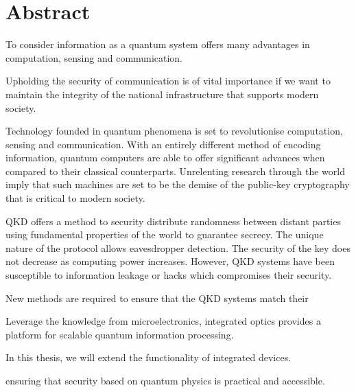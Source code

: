 %
%
%



\chapter*{Abstract}
To consider information as a quantum system offers many advantages in computation, sensing and communication. 

Upholding the security of communication is of vital importance if we want to maintain the integrity of the national infrastructure that supports modern society.

Technology founded in quantum phenomena is set to revolutionise computation, sensing and communication. With an entirely different method of encoding information, quantum computers are able to offer significant advances when compared to their classical counterparts. Unrelenting research through the world imply that such machines are set to be the demise of the public-key cryptography that is critical to modern society.

\Ac{QKD} offers a method to security distribute randomness between distant parties using fundamental properties of the world to guarantee secrecy. The unique nature of the protocol allows eavesdropper detection. The security of the key does not decrease as computing power increases. However, \ac{QKD} systems have been susceptible to information leakage or hacks which compromises their security. 

New methods are required to ensure that the \ac{QKD} systems match their 

Leverage the knowledge from microelectronics, integrated optics provides a platform for scalable quantum information processing. 

In this thesis, we will extend the functionality of integrated devices.

ensuring that security based on quantum physics is practical and accessible.

\clearpage
